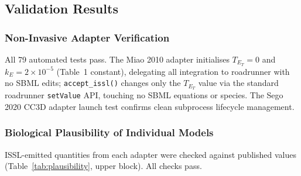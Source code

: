 \documentclass[conference,letterpaper,10pt]{IEEEtran}
\begin{document}
\subsection{Validation Results}

\subsubsection{Non-Invasive Adapter Verification}
All 79 automated tests pass. The Miao 2010 adapter initialises
$T_{E_T}=0$ and $k_E=2{\times}10^{-5}$ (Table~1 constant), delegating all
integration to roadrunner with no SBML edits; \texttt{accept\_issl()}
changes only the $T_{E_T}$ value via the standard roadrunner
\texttt{setValue} API, touching no SBML equations or species. The Sego 2020
CC3D adapter launch test confirms clean subprocess lifecycle management.

\subsubsection{Biological Plausibility of Individual Models}
ISSL-emitted quantities from each adapter were checked against published
values (Table~\ref{tab:plausibility}, upper block). All checks pass.
\end{document}
